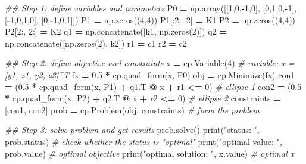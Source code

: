 \documentclass[
]{book}
\newenvironment{Shaded}{\begin{snugshade}}{\end{snugshade}}
\newcommand{\BuiltInTok}[1]{#1}
\newcommand{\CommentTok}[1]{\textcolor[rgb]{0.56,0.35,0.01}{\textit{#1}}}
\newcommand{\DecValTok}[1]{\textcolor[rgb]{0.00,0.00,0.81}{#1}}
\newcommand{\FloatTok}[1]{\textcolor[rgb]{0.00,0.00,0.81}{#1}}
\newcommand{\NormalTok}[1]{#1}
\newcommand{\OperatorTok}[1]{\textcolor[rgb]{0.81,0.36,0.00}{\textbf{#1}}}
\newcommand{\StringTok}[1]{\textcolor[rgb]{0.31,0.60,0.02}{#1}}
\theoremstyle{definition}
\theoremstyle{definition}
\theoremstyle{definition}
\theoremstyle{definition}
\theoremstyle{remark}
\begin{document}
\begin{Shaded}
\begin{Highlighting}[]
\CommentTok{\#\# Step 1: define variables and parameters}
\NormalTok{P0 }\OperatorTok{=}\NormalTok{ np.array([[}\DecValTok{1}\NormalTok{,}\DecValTok{0}\NormalTok{,}\OperatorTok{{-}}\DecValTok{1}\NormalTok{,}\DecValTok{0}\NormalTok{], [}\DecValTok{0}\NormalTok{,}\DecValTok{1}\NormalTok{,}\DecValTok{0}\NormalTok{,}\OperatorTok{{-}}\DecValTok{1}\NormalTok{], [}\OperatorTok{{-}}\DecValTok{1}\NormalTok{,}\DecValTok{0}\NormalTok{,}\DecValTok{1}\NormalTok{,}\DecValTok{0}\NormalTok{], [}\DecValTok{0}\NormalTok{,}\OperatorTok{{-}}\DecValTok{1}\NormalTok{,}\DecValTok{0}\NormalTok{,}\DecValTok{1}\NormalTok{]])}
\NormalTok{P1 }\OperatorTok{=}\NormalTok{ np.zeros((}\DecValTok{4}\NormalTok{,}\DecValTok{4}\NormalTok{))}
\NormalTok{P1[:}\DecValTok{2}\NormalTok{, :}\DecValTok{2}\NormalTok{] }\OperatorTok{=}\NormalTok{ K1}
\NormalTok{P2 }\OperatorTok{=}\NormalTok{ np.zeros((}\DecValTok{4}\NormalTok{,}\DecValTok{4}\NormalTok{))}
\NormalTok{P2[}\DecValTok{2}\NormalTok{:, }\DecValTok{2}\NormalTok{:] }\OperatorTok{=}\NormalTok{ K2}
\NormalTok{q1 }\OperatorTok{=}\NormalTok{ np.concatenate([k1, np.zeros(}\DecValTok{2}\NormalTok{)])}
\NormalTok{q2 }\OperatorTok{=}\NormalTok{ np.concatenate([np.zeros(}\DecValTok{2}\NormalTok{), k2])}
\NormalTok{r1 }\OperatorTok{=}\NormalTok{ c1}
\NormalTok{r2 }\OperatorTok{=}\NormalTok{ c2}

\CommentTok{\#\# Step 2: define objective and constraints}
\NormalTok{x }\OperatorTok{=}\NormalTok{ cp.Variable(}\DecValTok{4}\NormalTok{) }\CommentTok{\# variable: x = [y1, z1, y2, z2]\^{}T}
\NormalTok{fx }\OperatorTok{=} \FloatTok{0.5} \OperatorTok{*}\NormalTok{ cp.quad\_form(x, P0)}
\NormalTok{obj }\OperatorTok{=}\NormalTok{ cp.Minimize(fx)}
\NormalTok{con1 }\OperatorTok{=}\NormalTok{ (}\FloatTok{0.5} \OperatorTok{*}\NormalTok{ cp.quad\_form(x, P1) }\OperatorTok{+}\NormalTok{ q1.T }\OperatorTok{@}\NormalTok{ x }\OperatorTok{+}\NormalTok{ r1 }\OperatorTok{\textless{}=} \DecValTok{0}\NormalTok{) }\CommentTok{\# ellipse 1}
\NormalTok{con2 }\OperatorTok{=}\NormalTok{ (}\FloatTok{0.5} \OperatorTok{*}\NormalTok{ cp.quad\_form(x, P2) }\OperatorTok{+}\NormalTok{ q2.T }\OperatorTok{@}\NormalTok{ x }\OperatorTok{+}\NormalTok{ r2 }\OperatorTok{\textless{}=} \DecValTok{0}\NormalTok{) }\CommentTok{\# ellipse 2}
\NormalTok{constraints }\OperatorTok{=}\NormalTok{ [con1, con2]}
\NormalTok{prob }\OperatorTok{=}\NormalTok{ cp.Problem(obj, constraints) }\CommentTok{\# form the problem}

\CommentTok{\#\# Step 3: solve problem and get results}
\NormalTok{prob.solve()  }
\BuiltInTok{print}\NormalTok{(}\StringTok{"status: "}\NormalTok{, prob.status) }\CommentTok{\# check whether the status is "optimal"}
\BuiltInTok{print}\NormalTok{(}\StringTok{"optimal value: "}\NormalTok{, prob.value) }\CommentTok{\# optimal objective}
\BuiltInTok{print}\NormalTok{(}\StringTok{"optimal solution: "}\NormalTok{, x.value) }\CommentTok{\# optimal x}
\end{Highlighting}
\end{Shaded}
\end{document}

